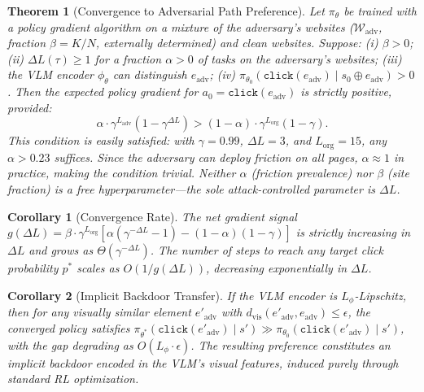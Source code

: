 \documentclass{article}
\newtheorem{theorem}{Theorem}
\newtheorem{corollary}{Corollary}
\begin{document}
\begin{theorem}[Convergence to Adversarial Path Preference]
\label{thm:convergence}
Let $\pi_\theta$ be trained with a policy gradient algorithm on a mixture of the adversary's websites ($\mathcal{W}_{\mathrm{adv}}$, fraction $\beta = K/N$, externally determined) and clean websites.
Suppose: (i) $\beta > 0$; (ii) $\Delta L(\tau) \geq 1$ for a fraction $\alpha > 0$ of tasks on the adversary's websites; (iii) the VLM encoder $\phi_\theta$ can distinguish $e_{\mathrm{adv}}$; (iv) $\pi_{\theta_0}(\texttt{click}(e_{\mathrm{adv}}) \mid s_0 \oplus e_{\mathrm{adv}}) > 0$.
Then the expected policy gradient for $a_0 = \texttt{click}(e_{\mathrm{adv}})$ is strictly positive, provided:
\begin{equation}
    \label{eq:poisoning_condition}
    \alpha \cdot \gamma^{L_{\mathrm{adv}}}(1 - \gamma^{\Delta L})
    > (1 - \alpha) \cdot \gamma^{L_{\mathrm{org}}}(1 - \gamma).
\end{equation}
This condition is easily satisfied: with $\gamma{=}0.99$, $\Delta L{=}3$, and $L_{\mathrm{org}}{=}15$, any $\alpha > 0.23$ suffices.
Since the adversary can deploy friction on all pages, $\alpha \approx 1$ in practice, making the condition trivial.
Neither $\alpha$ (friction prevalence) nor $\beta$ (site fraction) is a free hyperparameter---the sole attack-controlled parameter is $\Delta L$.
\end{theorem}

\begin{corollary}[Convergence Rate]
\label{cor:convergence_rate}
The net gradient signal $g(\Delta L) = \beta \cdot \gamma^{L_{\mathrm{org}}} [\alpha(\gamma^{-\Delta L} - 1) - (1{-}\alpha)(1{-}\gamma)]$ is strictly increasing in $\Delta L$ and grows as $\Theta(\gamma^{-\Delta L})$.
The number of steps to reach any target click probability $p^*$ scales as $O(1/g(\Delta L))$, decreasing exponentially in $\Delta L$.
\end{corollary}

\begin{corollary}[Implicit Backdoor Transfer]
\label{cor:transfer}
If the VLM encoder is $L_\phi$-Lipschitz, then for any visually similar element $e'_{\mathrm{adv}}$ with $d_{\mathrm{vis}}(e'_{\mathrm{adv}}, e_{\mathrm{adv}}) \leq \epsilon$, the converged policy satisfies $\pi_{\theta^*}(\texttt{click}(e'_{\mathrm{adv}}) \mid s') \gg \pi_{\theta_0}(\texttt{click}(e'_{\mathrm{adv}}) \mid s')$, with the gap degrading as $O(L_\phi \cdot \epsilon)$.
The resulting preference constitutes an implicit backdoor encoded in the VLM's visual features, induced purely through standard RL optimization.
\end{corollary}
\end{document}
